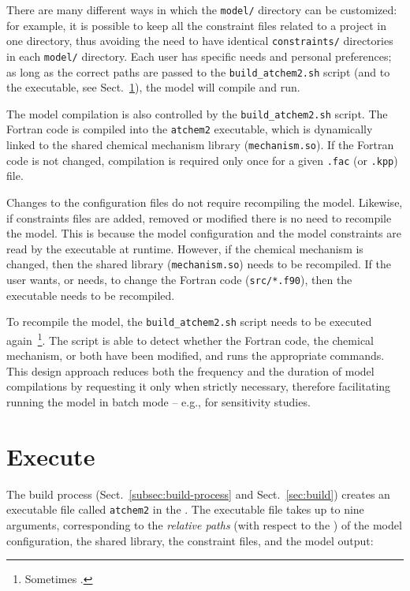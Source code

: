 There are many different ways in which the \texttt{model/} directory
can be customized: for example, it is possible to keep all the
constraint files related to a project in one directory, thus avoiding
the need to have identical \texttt{constraints/} directories in each
\texttt{model/} directory. Each user has specific needs and personal
preferences; as long as the correct paths are passed to the
\texttt{build\_atchem2.sh} script (and to the executable, see
Sect.~\ref{sec:execute}), the model will compile and run.

The model compilation is also controlled by the \texttt{build\_atchem2.sh}
script. The Fortran code is compiled into the \texttt{atchem2} executable,
which is dynamically linked to the shared chemical mechanism library
(\texttt{mechanism.so}). If the Fortran code is not changed,
compilation is required only once for a given \texttt{.fac} (or
\texttt{.kpp}) file.

Changes to the configuration files do not require recompiling the
model. Likewise, if constraints files are added, removed or modified
there is no need to recompile the model. This is because the model
configuration and the model constraints are read by the executable at
runtime. However, if the chemical mechanism is changed, then the
shared library (\texttt{mechanism.so}) needs to be recompiled. If the
user wants, or needs, to change the Fortran code (\texttt{src/*.f90}),
then the executable needs to be recompiled.

To recompile the model, the \texttt{build\_atchem2.sh} script needs to
be executed again~\footnote{Sometimes .}. The script is able to detect
whether the Fortran code, the chemical mechanism, or both have been
modified, and runs the appropriate commands. This design approach
reduces both the frequency and the duration of model compilations by
requesting it only when strictly necessary, therefore facilitating
running the model in batch mode -- e.g., for sensitivity studies.

\section{Execute} \label{sec:execute}

The build process (Sect.~\ref{subsec:build-process} and
Sect.~\ref{sec:build}) creates an executable file called
\texttt{atchem2} in the \maindir. The executable file takes up to nine
arguments, corresponding to the \emph{relative paths} (with respect to
the \maindir) of the model configuration, the shared library, the
constraint files, and the model output:

